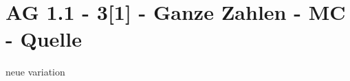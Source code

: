 \section{AG 1.1 - 3[1] - Ganze Zahlen - MC - Quelle}

\begin{beispiel}[AG 1.1]{1}
neue variation
\end{beispiel}